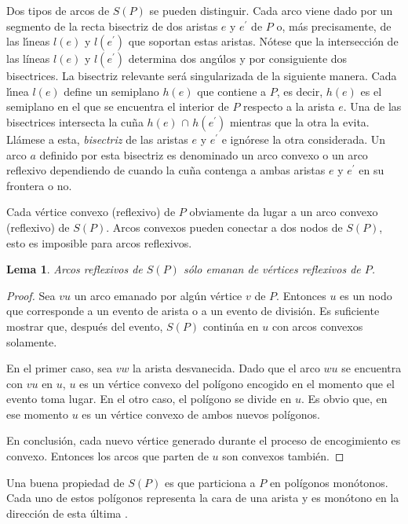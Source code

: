\documentclass[12pt,english]{report}
\newtheorem{lemma}[theorem]{Lema}
\begin{document}
Dos tipos de arcos de $S(P)$ se pueden distinguir. Cada arco viene dado por
un segmento de la recta bisectriz de dos aristas $e$ y $e^{\prime }$ de $P$ o,
m\'{a}s precisamente, de las l\'{\i}neas $l(e)$ y $l(e^{\prime} )$ que
soportan estas aristas. N\'{o}tese que la intersecci\'on de las l\'ineas $l(e)$ y $%
l(e^{\prime} )$ determina dos ang\'ulos y por consiguiente dos bisectrices. La bisectriz relevante ser\'a singularizada de la
siguiente manera. Cada l\'{\i}nea $l(e)$ define un semiplano $h(e)$ que
contiene a $P$, es decir, $h(e)$ es el semiplano en el que se encuentra el interior de $P$ 
respecto a la arista $e$. Una de las bisectrices intersecta la cu\~{n}a $h(e)
$ $\cap$ $h(e^{\prime} )$ mientras que la otra la evita. Ll\'{a}mese a esta,
\emph{bisectriz} de las aristas $e$ y $e^{\prime }$ e ign\'{o}rese la otra
considerada. Un arco $a$ definido por esta bisectriz es denominado un arco
convexo o un arco reflexivo dependiendo de cuando la cu\~{n}a contenga a
ambas aristas $e$ y $e^{\prime} $ en su frontera o no.

Cada v\'{e}rtice convexo (reflexivo) de $P$ obviamente da lugar a un arco
convexo (reflexivo) de $S(P)$. Arcos convexos pueden conectar a
dos nodos de $S(P)$, esto es imposible para arcos reflexivos.

\begin{lemma}
Arcos reflexivos de $S(P)$ s\'olo emanan de v\'ertices reflexivos de $P$.
\end{lemma}

\begin{proof}
Sea $vu$ un arco emanado por alg\'un v\'ertice $v$ de $P$. Entonces $u$ es un nodo que corresponde a un evento de arista o a un evento de divisi\'on. Es suficiente mostrar que, despu\'es del evento, $S(P)$ contin\'ua en $u$ con arcos convexos solamente. 

En el primer caso, sea $vw$ la arista desvanecida. Dado que el arco $wu$ se encuentra con $vu$ en $u$, $u$ es un v\'ertice convexo del pol\'igono encogido en el momento que el evento toma lugar. En el otro caso, el pol\'igono se divide en $u$. Es obvio que, en ese momento $u$ es un v\'ertice convexo de ambos nuevos pol\'igonos.

En conclusi\'on, cada nuevo v\'ertice generado durante el proceso de encogimiento es convexo. Entonces los arcos que parten de $u$ son convexos tambi\'en.
\end{proof}

Una buena propiedad de $S(P)$ es que particiona a $P$ en pol\'igonos mon\'otonos. Cada uno de estos pol\'igonos representa la cara de una arista y es mon\'otono en la direcci\'on de esta \'ultima \cite{AA}. 
\end{document}
